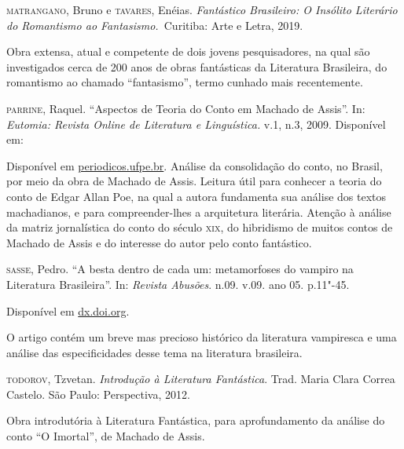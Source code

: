 \documentclass{extarticle}
\begin{document}
\textsc{matrangano}, Bruno e \textsc{tavares}, Enéias. \textit{Fantástico Brasileiro: O
Insólito Literário do Romantismo ao Fantasismo.~}Curitiba: Arte e Letra,
2019.

Obra extensa, atual e competente de dois jovens pesquisadores, na qual
são investigados cerca de 200 anos de obras fantásticas da Literatura
Brasileira, do romantismo ao chamado ``fantasismo'', termo cunhado mais
recentemente.

\textsc{parrine}, Raquel. ``Aspectos de Teoria do Conto em Machado de Assis''.
In: \textit{Eutomia: Revista Online de Literatura e Linguística.} v.1,
n.3, 2009. Disponível em:

Disponível em \href{https://periodicos.ufpe.br/revistas/EUTOMIA/article/view/1902/1489}{periodicos.ufpe.br}. Análise da consolidação do conto, no Brasil, por meio da obra de Machado
de Assis. Leitura útil para conhecer a teoria do conto de Edgar Allan
Poe, na qual a autora fundamenta sua análise dos textos machadianos, e
para compreender-lhes a arquitetura literária. Atenção à análise da
matriz jornalística do conto do século \textsc{xix}, do hibridismo de muitos
contos de Machado de Assis e do interesse do autor pelo conto
fantástico.

\textsc{sasse}, Pedro. ``A besta dentro de cada um: metamorfoses do vampiro na
Literatura Brasileira''. In: \textit{Revista Abusões}. n.09. v.09. ano
05. p.11"-45.

Disponível em \href{http://dx.doi.org/10.12957/abusoes.2019.40692}{dx.doi.org}.

O artigo contém um breve mas precioso histórico da literatura vampiresca
e uma análise das especificidades desse tema na literatura brasileira.

\textsc{todorov}, Tzvetan. \textit{Introdução à Literatura Fantástica}. Trad.
Maria Clara Correa Castelo. São Paulo: Perspectiva, 2012.

Obra introdutória à Literatura Fantástica, para aprofundamento da
análise do conto ``O Imortal'', de Machado de Assis.
\end{document}
